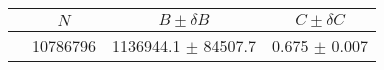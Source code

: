 \begin{tabular}{lccc}
\hline
    &   $N$   & $B \pm \delta B$  &  $C \pm \delta C$ \\
\hline
                               & 10786796   & 1136944.1  $\pm$ 84507.7 & 0.675      $\pm$ 0.007 \\
\hline
\end{tabular}
